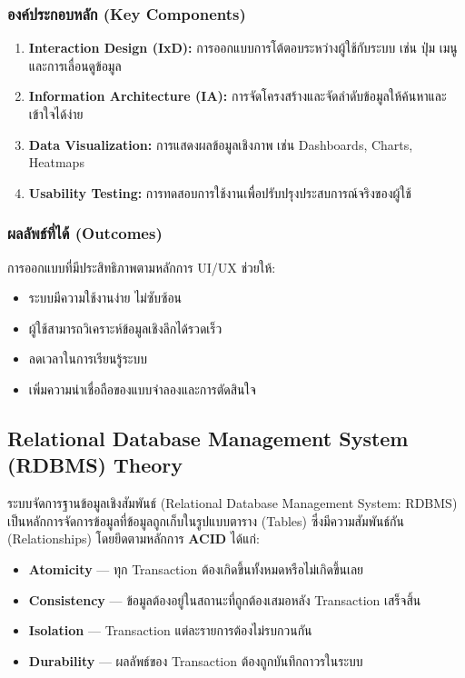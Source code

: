 \subsubsection{องค์ประกอบหลัก (Key Components)}
\begin{enumerate}
    \item \textbf{Interaction Design (IxD):} การออกแบบการโต้ตอบระหว่างผู้ใช้กับระบบ เช่น ปุ่ม เมนู และการเลื่อนดูข้อมูล
    \item \textbf{Information Architecture (IA):} การจัดโครงสร้างและจัดลำดับข้อมูลให้ค้นหาและเข้าใจได้ง่าย
    \item \textbf{Data Visualization:} การแสดงผลข้อมูลเชิงภาพ เช่น Dashboards, Charts, Heatmaps
    \item \textbf{Usability Testing:} การทดสอบการใช้งานเพื่อปรับปรุงประสบการณ์จริงของผู้ใช้
\end{enumerate}

\subsubsection{ผลลัพธ์ที่ได้ (Outcomes)}
การออกแบบที่มีประสิทธิภาพตามหลักการ UI/UX ช่วยให้:
\begin{itemize}
    \item ระบบมีความใช้งานง่าย ไม่ซับซ้อน
    \item ผู้ใช้สามารถวิเคราะห์ข้อมูลเชิงลึกได้รวดเร็ว
    \item ลดเวลาในการเรียนรู้ระบบ
    \item เพิ่มความน่าเชื่อถือของแบบจำลองและการตัดสินใจ
\end{itemize}

\subsection{Relational Database Management System (RDBMS) Theory}
ระบบจัดการฐานข้อมูลเชิงสัมพันธ์ (Relational Database Management System: RDBMS) 
เป็นหลักการจัดการข้อมูลที่ข้อมูลถูกเก็บในรูปแบบตาราง (Tables) 
ซึ่งมีความสัมพันธ์กัน (Relationships) โดยยึดตามหลักการ \textbf{ACID} ได้แก่:
\begin{itemize}
    \item \textbf{Atomicity} — ทุก Transaction ต้องเกิดขึ้นทั้งหมดหรือไม่เกิดขึ้นเลย
    \item \textbf{Consistency} — ข้อมูลต้องอยู่ในสถานะที่ถูกต้องเสมอหลัง Transaction เสร็จสิ้น
    \item \textbf{Isolation} — Transaction แต่ละรายการต้องไม่รบกวนกัน
    \item \textbf{Durability} — ผลลัพธ์ของ Transaction ต้องถูกบันทึกถาวรในระบบ
\end{itemize}

